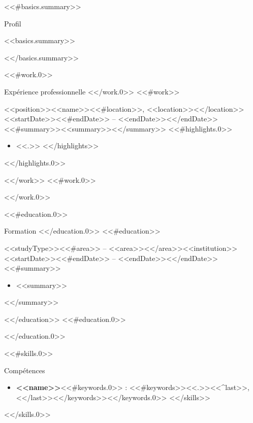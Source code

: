 \documentclass[a4paper]{mcdowellcv}
\begin{document}
  \makeheader

  <<#basics.summary>>
  \begin{cvsection}{Profil}
    \begin{cvsubsection}{}{}{}
      <<basics.summary>>
    \end{cvsubsection}
  \end{cvsection}
  <</basics.summary>>

  <<#work.0>>
  \begin{cvsection}{Expérience professionnelle}
  <</work.0>>
  <<#work>>
    \begin{cvsubsection}{<<position>>}{<<name>><<#location>>, <<location>><</location>>}{<<startDate>><<#endDate>> -- <<endDate>><</endDate>>}
      <<#summary>><<summary>><</summary>>
      <<#highlights.0>>
      \begin{itemize}
      <<#highlights>>
        \item <<.>>
      <</highlights>>
      \end{itemize}
      <</highlights.0>>
    \end{cvsubsection}
  <</work>>
  <<#work.0>>
  \end{cvsection}
  <</work.0>>

  <<#education.0>>
  \begin{cvsection}{Formation}
  <</education.0>>
  <<#education>>
    \begin{cvsubsection}{<<studyType>><<#area>> -- <<area>><</area>>}{<<institution>>}{<<startDate>><<#endDate>> -- <<endDate>><</endDate>>}
      <<#summary>>
      \begin{itemize}
        \item <<summary>>
      \end{itemize}
      <</summary>>
    \end{cvsubsection}
  <</education>>
  <<#education.0>>
  \end{cvsection}
  <</education.0>>

  <<#skills.0>>
  \begin{cvsection}{Compétences}
    \begin{cvsubsection}{}{}{}
      \begin{itemize}
      <<#skills>>
        \item \textbf{<<name>>}<<#keywords.0>> : <<#keywords>><<.>><<^last>>, <</last>><</keywords>><</keywords.0>>
      <</skills>>
      \end{itemize}
    \end{cvsubsection}
  \end{cvsection}
  <</skills.0>>
\end{document}
